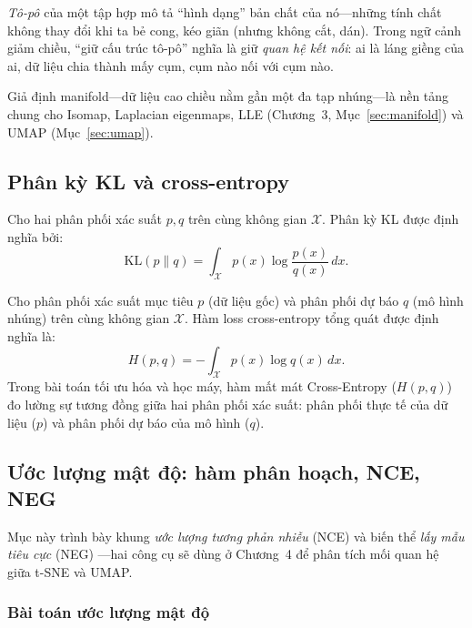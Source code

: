 \begin{definition}
\label{def:topology}
\emph{Tô-pô} của một tập hợp mô tả ``hình dạng'' bản chất của nó---những tính chất không thay đổi khi ta bẻ cong, kéo giãn (nhưng không cắt, dán). Trong ngữ cảnh giảm chiều, ``giữ cấu trúc tô-pô'' nghĩa là giữ \emph{quan hệ kết nối}: ai là láng giềng của ai, dữ liệu chia thành mấy cụm, cụm nào nối với cụm nào.
\end{definition}

Giả định manifold---dữ liệu cao chiều nằm gần một đa tạp nhúng---là nền tảng chung cho Isomap, Laplacian eigenmaps, LLE (Chương~3, Mục~\ref{sec:manifold}) và UMAP (Mục~\ref{sec:umap}).

\subsection{Phân kỳ KL và cross-entropy}
\label{sec:kl-ce}

\begin{definition}
\label{def:kl}
Cho hai phân phối xác suất $p, q$ trên cùng không gian $\mathcal{X}$. Phân kỳ KL được định nghĩa bởi:
\[
\mathrm{KL}(p \| q) = \int_{\mathcal{X}} p(x) \log \frac{p(x)}{q(x)} \, dx.
\]
\end{definition}

\begin{definition}
\label{def:ce}
Cho phân phối xác suất mục tiêu $p$ (dữ liệu gốc) và phân phối dự báo $q$ (mô hình nhúng) trên cùng không gian $\mathcal{X}$. Hàm loss cross-entropy tổng quát được định nghĩa là:
\[
H(p, q) = -\int_{\mathcal{X}} p(x) \log q(x) \, dx.
\]
Trong bài toán tối ưu hóa và học máy, hàm mất mát Cross-Entropy ($H(p,q)$) đo lường sự tương đồng giữa hai phân phối xác suất: phân phối thực tế của dữ liệu ($p$) và phân phối dự báo của mô hình ($q$).
\end{definition}


\subsection{Ước lượng mật độ: hàm phân hoạch, NCE, NEG}
\label{sec:nce-neg}

Mục này trình bày khung \emph{ước lượng tương phản nhiễu} (NCE) \cite{gutmann2010nce} và biến thể \emph{lấy mẫu tiêu cực} (NEG) \cite{mikolov2013word2vec}---hai công cụ sẽ dùng ở Chương~4 để phân tích mối quan hệ giữa t-SNE và UMAP.

\subsubsection{Bài toán ước lượng mật độ}

